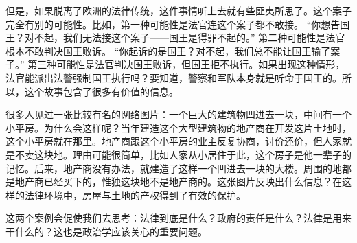 但是，如果脱离了欧洲的法律传统，这件事情听上去就有些匪夷所思了。这个案子完全有别的可能性。比如，第一种可能性是法官连这个案子都不敢接。 “你想告国王？对不起，我们无法接这个案子——国王是得罪不起的。” 第二种可能性是法官根本不敢判决国王败诉。 “你起诉的是国王？对不起，我们总不能让国王输了案子。” 第三种可能性是法官判决国王败诉，但国王拒不执行。如果出现这种情形，法官能派出法警强制国王执行吗？要知道，警察和军队本身就是听命于国王的。所以，这个故事包含了很多有价值的信息。

很多人见过一张比较有名的网络图片：一个巨大的建筑物凹进去一块，中间有一个小平房。为什么会这样呢？当年建造这个大型建筑物的地产商在开发这片土地时，这个小平房就在那里。地产商跟这个小平房的业主反复协商，讨价还价，但人家就是不卖这块地。理由可能很简单，比如人家从小居住于此，这个房子是他一辈子的记忆。后来，地产商没有办法，就建造了这样一个凹进去一块的大楼。周围的地都是地产商已经买下的，惟独这块地不是地产商的。这张图片反映出什么信息？在这样的法律环境中，房屋与土地的产权得到了有效的保护。

这两个案例会促使我们去思考：法律到底是什么？政府的责任是什么？法律是用来干什么的？这也是政治学应该关心的重要问题。


